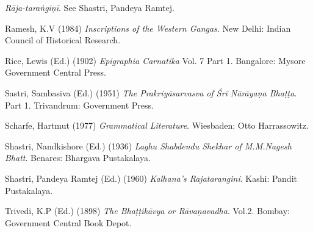 \begin{thebibliography}{99}
{\sl Rāja-taraṅgiṇī}. See Shastri, Pandeya Ramtej.

Ramesh, K.V (1984) {\sl Inscriptions of the Western Gangas}. New Delhi: Indian Council of Historical Research.

Rice, Lewis (Ed.) (1902) {\sl Epigraphia Carnatika} Vol. 7 Part 1. Bangalore: Mysore Government Central Press. 

Sastri, Sambasiva (Ed.) (1951) {\sl The Prakriyāsarvasva of Śrī Nārāyaṇa Bhaṭṭa}. Part 1. Trivandrum: Government Press. 

Scharfe, Hartmut (1977) {\sl Grammatical Literature}. Wiesbaden: Otto Harrassowitz. 

Shastri, Nandkishore (Ed.) (1936) {\sl Laghu Shabdendu Shekhar of M.M.Nagesh Bhatt}. Benares: Bhargava Pustakalaya. 

Shastri, Pandeya Ramtej (Ed.) (1960) {\sl Kalhana’s Rajatarangini}. Kashi: Pandit Pustakalaya. 

Trivedi, K.P (Ed.) (1898) {\sl The Bhaṭṭikāvya or Rāvaṇavadha}. Vol.2. Bombay: Government Central Book Depot. 
\end{thebibliography}

\theendnotes

